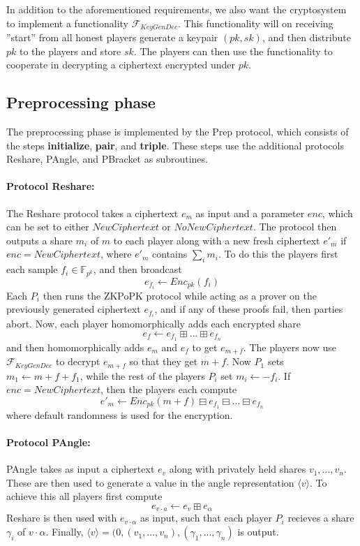\documentclass{article}
\begin{document}
In addition to the aforementioned requirements, we also want the cryptosystem to implement a functionality $\mathcal{F}_{KeyGenDec}$. This functionality will on receiving ''start'' from all honest players generate a keypair $(pk, sk)$, and then distribute $pk$ to the players and store $sk$. The players can then use the functionality to cooperate in decrypting a ciphertext encrypted under $pk$.

\subsection{Preprocessing phase} \label{subsection: Prep}
The preprocessing phase is implemented by the Prep protocol, which consists of the steps \textbf{initialize}, \textbf{pair}, and \textbf{triple}. These steps use the additional protocols Reshare, PAngle, and PBracket as subroutines.

\paragraph{Protocol Reshare:} The Reshare protocol takes a ciphertext $e_m$ as input and a parameter $enc$, which can be set to either $NewCiphertext$ or $NoNewCiphertext$. The protocol then outputs a share $m_i$ of $m$ to each player along with a new fresh ciphertext $e'_m$ if $enc = NewCiphertext$, where $e'_m$ contains $\sum_i m_i$.
To do this the players first each sample $f_i \in \mathbb{F}_{p^k}$, and then broadcast $$e_{f_i} \leftarrow Enc_{pk}(f_i)$$ 
Each $P_i$ then runs the ZKPoPK protocol while acting as a prover on the previously generated ciphertext $e_{f_i}$, and if any of these proofs fail, then parties abort.
Now, each player homomorphically adds each encrypted share
$$e_f \leftarrow e_{f_1} \boxplus ... \boxplus e_{f_n} $$
 and then homomorphically adds $e_m$ and $e_f$ to get $e_{m + f}$. The players now use $\mathcal{F}_{KeyGenDec}$ to decrypt $e_{m + f}$ so that they get $m + f$. Now $P_1$ sets $m_1 \leftarrow m + f + f_1$, while the rest of the players $P_i$ set $m_i \leftarrow - f_i$.
If $enc = NewCiphertext$, then the players each compute
$$e'_m \leftarrow Enc_{pk}(m + f) \boxminus e_{f_1} \boxminus ... \boxminus e_{f_n}$$ where default randomness is used for the encryption.

\paragraph{Protocol PAngle:}
PAngle takes as input a ciphertext $e_v$ along with privately held shares $v_1, ..., v_n$. These are then used to generate a value in the angle representation $\langle v \rangle$.
To achieve this all players first compute $$e_{v \cdot a} \leftarrow e_v \boxplus e_\alpha$$
Reshare is then used with $e_{v \cdot \alpha}$ as input, such that each player $P_i$ recieves a share $\gamma_i$ of $v \cdot \alpha$. Finally, $\langle v \rangle = (0, (v_1, ..., v_n), (\gamma_1, ..., \gamma_n)$ is output.
\end{document}
